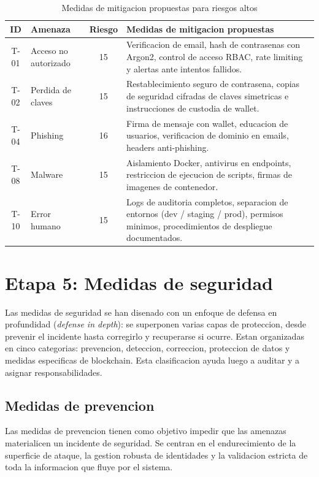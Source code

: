 \documentclass[11pt, a4paper]{article}
\begin{document}
\begin{table}[H]
\centering
\renewcommand{\arraystretch}{1.4}
\small
\begin{tabular}{|c|l|c|p{6cm}|}
\hline
\textbf{ID} & \textbf{Amenaza} & \textbf{Riesgo} & \textbf{Medidas de mitigacion propuestas} \\
\hline
T-01 & Acceso no autorizado & 15 & Verificacion de email, hash de contrasenas con Argon2, control de acceso RBAC, rate limiting y alertas ante intentos fallidos. \\
\hline
T-02 & Perdida de claves & 15 & Restablecimiento seguro de contrasena, copias de seguridad cifradas de claves simetricas e instrucciones de custodia de wallet. \\
\hline
T-04 & Phishing & 16 & Firma de mensaje con wallet, educacion de usuarios, verificacion de dominio en emails, headers anti-phishing. \\
\hline
T-08 & Malware & 15 & Aislamiento Docker, antivirus en endpoints, restriccion de ejecucion de scripts, firmas de imagenes de contenedor. \\
\hline
T-10 & Error humano & 15 & Logs de auditoria completos, separacion de entornos (dev / staging / prod), permisos minimos, procedimientos de despliegue documentados. \\
\hline
\end{tabular}
\caption{Medidas de mitigacion propuestas para riesgos altos}
\label{tab:mitigacion}
\end{table}

\section{Etapa 5: Medidas de seguridad}

Las medidas de seguridad se han disenado con un enfoque de defensa en profundidad (\textit{defense in depth}): se superponen varias capas de proteccion, desde prevenir el incidente hasta corregirlo y recuperarse si ocurre. Estan organizadas en cinco categorias: prevencion, deteccion, correccion, proteccion de datos y medidas especificas de blockchain. Esta clasificacion ayuda luego a auditar y a asignar responsabilidades.

\subsection{Medidas de prevencion}

Las medidas de prevencion tienen como objetivo impedir que las amenazas materialicen un incidente de seguridad. Se centran en el endurecimiento de la superficie de ataque, la gestion robusta de identidades y la validacion estricta de toda la informacion que fluye por el sistema.
\end{document}
